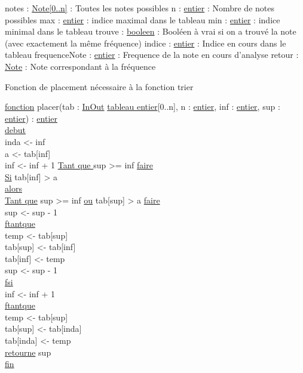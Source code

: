 notes : \ul{Note[0..n]} : Toutes les notes possibles\newline
n :  \ul{entier} : Nombre de notes possibles\newline
max : \ul{entier} : indice maximal dans le tableau\newline
min : \ul{entier} : indice minimal dans le tableau\newline
trouve : \ul{booleen} : Booléen à vrai si on a trouvé la note (avec exactement la même fréquence)\newline
indice : \ul{entier} : Indice en cours dans le tableau\newline
frequenceNote : \ul{entier} : Frequence de la note en cours d'analyse\newline
retour : \ul{Note} : Note correspondant à la fréquence\newline

Fonction de placement nécessaire à la fonction trier\newline

\begin{tabbing}
\ul{fonction} placer(tab : \ul{InOut} \ul{tableau entier}[0..n], n : \ul{entier}, inf : \ul{entier}, sup : \ul{entier}) : \ul{entier}\\
\ul{debut}\\
    inda <- inf\\
    a <- tab[inf]\\
    inf <- inf + 1
    \ul{Tant que } sup >= inf \ul{faire}\\
        \ul{Si} tab[inf] > a\\
        \ul{alors}\\
            \ul{Tant que} sup >= inf \ul{ou} tab[sup] > a \ul{faire}\\
                sup <- sup - 1\\
            \ul{ftantque}\\
            temp <- tab[sup]\\
            tab[sup] <- tab[inf]\\
            tab[inf] <- temp\\
            sup <- sup - 1\\
        \ul{fsi}\\
        inf <- inf + 1\\
    \ul{ftantque}\\
    temp <- tab[sup]\\
    tab[sup] <- tab[inda]\\
    tab[inda] <- temp\\
    \ul{retourne} sup\\
\ul{fin}\\
\end{tabbing}

